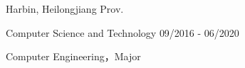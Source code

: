\vspace{-6.0mm}

\begin{cventries}
\vspace{-1.5mm}

\cveducation
{}
{Harbin, Heilongjiang Prov.}

\cvsubeducation
{Computer Science and Technology}
{09/2016 - 06/2020}
{
    \begin{cvitems}
    \item {Computer Engineering，Major}
    \end{cvitems}
}

\end{cventries}